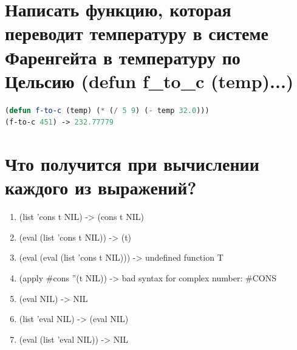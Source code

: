 \documentclass[12pt]{report}
\begin{document}
\section{Написать функцию, которая переводит температуру в системе Фаренгейта в температуру по Цельсию (defun f\_to\_c (temp)...)}

\begin{lstlisting}[language=Lisp]
(defun f-to-c (temp) (* (/ 5 9) (- temp 32.0)))
(f-to-c 451) -> 232.77779 
\end{lstlisting}


\section{Что получится при вычислении каждого из выражений?}

\begin{enumerate}
    \item (list 'cons t NIL) -> (cons t NIL)

    \item (eval (list 'cons t NIL)) -> (t)

    \item (eval (eval (list 'cons t NIL))) -> undefined function T

    \item (apply #cons ''(t NIL)) -> bad syntax for complex number: #CONS

    \item (eval NIL) -> NIL

    \item (list 'eval NIL) -> (eval NIL)

    \item (eval (list 'eval NIL)) -> NIL
    

\end{enumerate}

	
\end{document}
